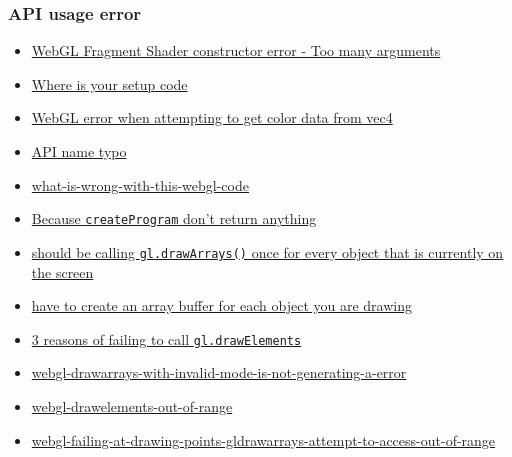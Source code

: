 \subsubsection{API usage error}\label{api-usage-error}

\begin{itemize}
\tightlist
\item
  \href{http://stackoverflow.com/questions/33725228/webgl-fragment-shader-constructor-error-too-many-arguments}{WebGL
  Fragment Shader constructor error - Too many arguments}
\item
  \href{http://stackoverflow.com/questions/28490041/webgl-vbo-error-in-firefox}{Where
  is your setup code}
\item
  \href{http://stackoverflow.com/questions/32618792/webgl-error-when-attempting-to-get-color-data-from-vec4}{WebGL
  error when attempting to get color data from vec4}
\item
  \href{http://stackoverflow.com/questions/26544800/simple-triangle-in-webgl}{API
  name typo}
\item
  \href{http://stackoverflow.com/questions/21436678/what-is-wrong-with-this-webgl-code}{what-is-wrong-with-this-webgl-code}
\item
  \href{http://stackoverflow.com/questions/33057640/why-my-mutiple-animated-objects-are-not-displayed-by-my-code-webgl}{Because
  \texttt{createProgram} don't return anything}
\item
  \href{http://stackoverflow.com/questions/19758786/webgl-keep-previous-object}{should
  be calling \texttt{gl.drawArrays()} once for every object that is
  currently on the screen}
\item
  \href{http://stackoverflow.com/questions/17316171/webgl-drawarrays-attribs-not-setup-correctly}{have
  to create an array buffer for each object you are drawing}
\item
  \href{http://stackoverflow.com/questions/32447641/what-is-common-cause-of-range-out-of-bounds-of-buffer-in-webgl}{3
  reasons of failing to call \texttt{gl.drawElements}}
\item
  \href{http://stackoverflow.com/questions/8900559/webgl-drawarrays-with-invalid-mode-is-not-generating-a-error}{webgl-drawarrays-with-invalid-mode-is-not-generating-a-error}
\item
  \href{http://stackoverflow.com/questions/15751791/webgl-drawelements-out-of-range}{webgl-drawelements-out-of-range}
\item
  \href{http://stackoverflow.com/questions/31750163/webgl-failing-at-drawing-points-gldrawarrays-attempt-to-access-out-of-range}{webgl-failing-at-drawing-points-gldrawarrays-attempt-to-access-out-of-range}

\end{itemize}
